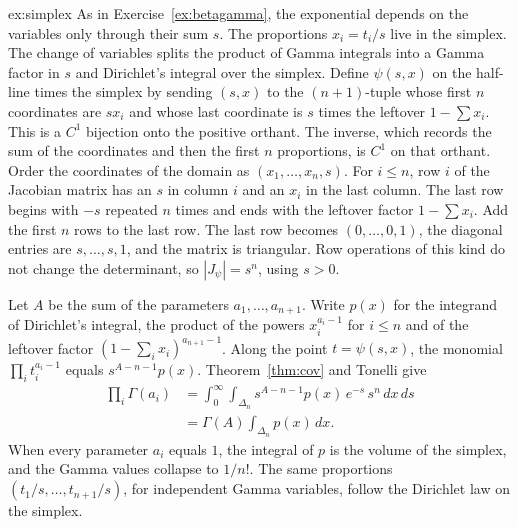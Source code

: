 \begin{solution}{ex:simplex}
\idea As in Exercise~\ref{ex:betagamma}, the exponential depends on the variables only through their sum $s$. The proportions $x_i=t_i/s$ live in the simplex. The change of variables splits the product of Gamma integrals into a Gamma factor in $s$ and Dirichlet's integral over the simplex.
\writeup Define $\psi(s,x)$ on the half-line times the simplex by sending $(s,x)$ to the $(n+1)$-tuple whose first $n$ coordinates are $s x_i$ and whose last coordinate is $s$ times the leftover $1-\sum x_i$. This is a $C^1$ bijection onto the positive orthant. The inverse, which records the sum of the coordinates and then the first $n$ proportions, is $C^1$ on that orthant. Order the coordinates of the domain as $(x_1,\dots,x_n,s)$. For $i\le n$, row $i$ of the Jacobian matrix has an $s$ in column $i$ and an $x_i$ in the last column. The last row begins with $-s$ repeated $n$ times and ends with the leftover factor $1-\sum x_i$. Add the first $n$ rows to the last row. The last row becomes $(0,\dots,0,1)$, the diagonal entries are $s,\dots,s,1$, and the matrix is triangular. Row operations of this kind do not change the determinant, so $|J_\psi|=s^n$, using $s>0$.

Let $A$ be the sum of the parameters $a_1,\dots,a_{n+1}$. Write $p(x)$ for the integrand of Dirichlet's integral, the product of the powers $x_i^{a_i-1}$ for $i\le n$ and of the leftover factor $(1-\sum_i x_i)^{a_{n+1}-1}$. Along the point $t=\psi(s,x)$, the monomial $\prod_i t_i^{a_i-1}$ equals $s^{A-n-1}p(x)$. Theorem~\ref{thm:cov} and Tonelli give
\begin{align*}
\prod_i\Gamma(a_i)
&=\int_0^\infty\!\!\int_{\Delta_n}s^{A-n-1}p(x)\,e^{-s}\,s^n\,dx\,ds\\
&=\Gamma(A)\int_{\Delta_n}p(x)\,dx.
\end{align*}
When every parameter $a_i$ equals $1$, the integral of $p$ is the volume of the simplex, and the Gamma values collapse to $1/n!$. The same proportions $(t_1/s,\dots,t_{n+1}/s)$, for independent Gamma variables, follow the Dirichlet law on the simplex.
\end{solution}

